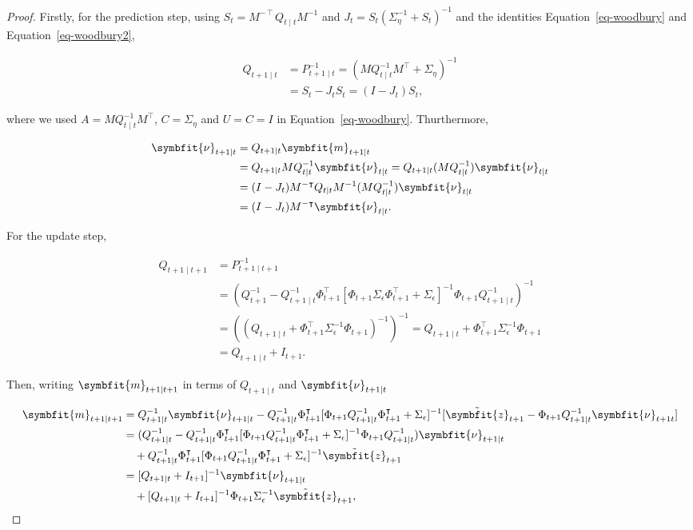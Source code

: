 \documentclass[
]{report}
\newcommand{\bv}[1]{\symbfit{#1}}
\theoremstyle{plain}
\theoremstyle{plain}
\theoremstyle{remark}
\begin{document}
\begin{proof}
Firstly, for the prediction step, using
\(S_t = M^{-\intercal}Q_{t\mid t}M^{-1}\) and
\(J_t = S_t(\Sigma_\eta^{-1} + S_t)^{-1}\) and the identities
Equation~\ref{eq-woodbury} and Equation~\ref{eq-woodbury2},

\[\begin{split}
  Q_{t+1\mid t} &= P_{t+1\mid t}^{-1} = (MQ_{t\mid t}^{-1}M^\intercal + \Sigma_\eta)^{-1}\\
  &= S_t - J_t S_t = (I-J_t)S_t,
\end{split}
\]

where we used \(A=MQ_{t\mid t}^{-1}M^\intercal\), \(C=\Sigma_\eta\) and
\(U=C=I\) in Equation~\ref{eq-woodbury}. Thurthermore,

\[\begin{split}
  \bv \nu_{t+1\mid t} &= Q_{t+1\mid t} \bv m_{t+1\mid t}\\
  &= Q_{t+1\mid t} M Q_{t\mid t}^{-1} \bv \nu_{t\mid t} = Q_{t+1\mid t} (M Q_{t\mid t}^{-1}) \bv \nu_{t\mid t}\\
  &= (I-J_t)M^{-\intercal}Q_{t\mid t}M^{-1} (M Q_{t\mid t}^{-1}) \bv \nu_{t\mid t}\\
  &= (I-J_t)M^{-\intercal} \bv \nu_{t\mid t}.
\end{split}
\]

For the update step,

\[\begin{split}
  Q_{t+1\mid t+1} &= P_{t+1\mid t+1}^{-1}\\
  &= (Q_{t+1}^{-1} - Q_{t+1\mid t}^{-1}\Phi_{t+1}^\intercal[\Phi_{t+1}\Sigma_\epsilon\Phi_{t+1}^\intercal + \Sigma_\epsilon]^{-1}\Phi_{t+1}Q_{t+1\mid t}^{-1})^{-1}\\
  &= ((Q_{t+1\mid t} + \Phi_{t+1}^\intercal\Sigma_\epsilon^{-1}\Phi_{t+1})^{-1})^{-1} = Q_{t+1\mid t} + \Phi_{t+1}^\intercal\Sigma_\epsilon^{-1}\Phi_{t+1}\\
  &= Q_{t+1\mid t} + I_{t+1}.
\end{split}
\]

Then, writing \(\bv m_{t+1\mid t+1}\) in terms of \(Q_{t+1\mid t}\) and
\(\bv \nu_{t+1\mid t}\)

\[\begin{split}
  \bv m_{t+1\mid t+1} &= Q_{t+1\mid t}^{-1} \bv \nu_{t+1\mid t} - Q_{t+1\mid t}^{-1}\Phi_{t+1}^\intercal[\Phi_{t+1}Q_{t+1\mid t}^{-1}\Phi_{t+1}^\intercal +\Sigma_\epsilon]^{-1} [\tilde{\bv z}_{t+1} - \Phi_{t+1}Q_{t+1\mid t}^{-1}\bv \nu_{t+1\mit t}]\\
  &= (Q_{t+1\mid t}^{-1} - Q_{t+1\mid t}^{-1}\Phi_{t+1}^\intercal[\Phi_{t+1}Q_{t+1\mid t}^{-1}\Phi_{t+1}^\intercal +\Sigma_\epsilon]^{-1}\Phi_{t+1}Q_{t+1\mid t}^{-1})\bv \nu_{t+1\mid t} \\
  &\quad + Q_{t+1\mid t}^{-1}\Phi_{t+1}^\intercal[\Phi_{t+1}Q_{t+1\mid t}^{-1}\Phi_{t+1}^\intercal +\Sigma_\epsilon]^{-1}\tilde{\bv z}_{t+1}\\
  &= [Q_{t+1\mid t} + I_{t+1}]^{-1}\bv \nu_{t+1\mid t}\\
  &\quad + [Q_{t+1\mid t} + I_{t+1}]^{-1}\Phi_{t+1}\Sigma_\epsilon^{-1}\tilde{\bv z}_{t+1},
\end{split} 
\]


\end{proof}
\end{document}
